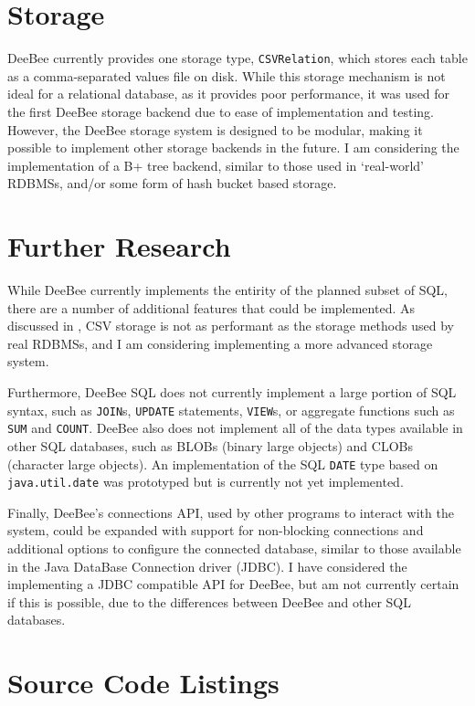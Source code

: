 \section{Storage}
\label{sec:storage}
DeeBee currently provides one storage type, \texttt{CSVRelation}, which stores each table as a comma-separated values file on disk. While this storage mechanism is not ideal for a relational database, as it provides poor performance, it was used for the first DeeBee storage backend due to ease of implementation and testing. However, the DeeBee storage system is designed to be modular, making it possible to implement other storage backends in the future. I am considering the implementation of a B+ tree backend, similar to those used in `real-world' RDBMSs, and/or some form of hash bucket based storage.

\section{Further Research}
While DeeBee currently implements the entirity of the planned subset of SQL, there are a number of additional features that could be implemented. As discussed in , CSV storage is not as performant as the storage methods used by real RDBMSs, and I am considering implementing a more advanced storage system. 

Furthermore, DeeBee SQL does not currently implement a large portion of SQL syntax, such as \texttt{JOIN}s, \texttt{UPDATE} statements, \texttt{VIEW}s, or aggregate functions such as \texttt{SUM} and \texttt{COUNT}. DeeBee also does not implement all of the data types available in other SQL databases, such as BLOBs (binary large objects) and CLOBs (character large objects). An implementation of the SQL \texttt{DATE} type based on \texttt{java.util.date} was prototyped but is currently not yet implemented. 

Finally, DeeBee's connections API, used by other programs to interact with the system, could be expanded with support for non-blocking connections and additional options to configure the connected database, similar to those available in the Java DataBase Connection driver (JDBC). I have considered the implementing a JDBC compatible API for DeeBee, but am not currently certain if this is possible, due to the differences between DeeBee and other SQL databases.
\pagebreak
\section{Source Code Listings}

\inputminted{src/scala/main/deebee/storage/CSVRelation.scala}{scala}
\pagebreak
{}


